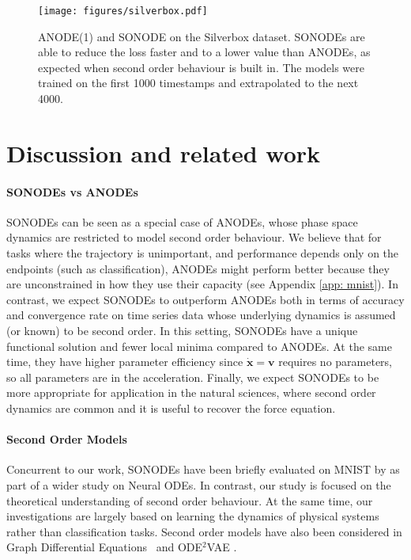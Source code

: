 \documentclass{article}
\theoremstyle{remark}
\theoremstyle{definition}
\begin{document}
\begin{figure}[h]
\centering
    \texttt{[image: figures/silverbox.pdf]}
    \vspace{-10pt}
    \caption{ANODE(1) and SONODE on the Silverbox dataset. SONODEs are able to reduce the loss faster and to a lower value than ANODEs, as expected when second order behaviour is built in. The models were trained on the first 1000 timestamps and extrapolated to the next 4000.}
    \vspace{-10pt}
    \label{fig: silverbox}
\end{figure}


\section{Discussion and related work}

\paragraph{SONODEs vs ANODEs} SONODEs can be seen as a special case of ANODEs, whose phase space dynamics are restricted to model second order behaviour. We believe that for tasks where the trajectory is unimportant, and performance depends only on the endpoints (such as classification), ANODEs might perform better because they are unconstrained in how they use their capacity (see Appendix \ref{app: mnist}). In contrast, we expect SONODEs to outperform ANODEs both in terms of accuracy and convergence rate on time series data whose underlying dynamics is assumed (or known) to be second order. In this setting, SONODEs have a unique functional solution and fewer local minima compared to ANODEs. At the same time, they have higher parameter efficiency since $\dot{\mathbf{x}}=\mathbf{v}$ requires no parameters, so all parameters are in the acceleration. Finally, we expect SONODEs to be more appropriate for application in the natural sciences, where second order dynamics are common and it is useful to recover the force equation. 

\paragraph{Second Order Models} Concurrent to our work, SONODEs have been briefly evaluated on MNIST by \citet{massaroli2020dissecting} as part of a wider study on Neural ODEs. In contrast, our study is focused on the theoretical understanding of second order behaviour. At the same time, our investigations are largely based on learning the dynamics of physical systems rather than classification tasks. Second order models have also been considered in Graph Differential Equations~\citep{poli2019graph} and ODE$^2$VAE \citep{yldz2019ode2vae}. 
\end{document}
